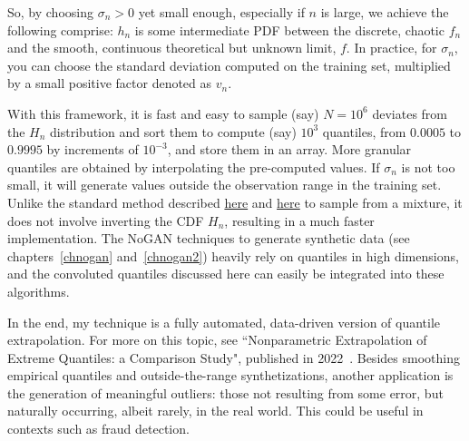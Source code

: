 \documentclass[oneside,10pt]{book}
\begin{document}
So, by choosing $\sigma_n > 0$ yet small enough, especially if $n$ is large, we achieve the
 following comprise: $h_n$ is some intermediate PDF between the discrete, chaotic $f_n$ and the smooth, continuous theoretical but unknown limit, $f$. In practice, for $\sigma_n$, you can choose the standard deviation computed on the training set, multiplied by a small positive factor denoted as $v_n$.


With this framework, it is fast and easy to sample (say) $N=10^6$ deviates from the $H_n$ distribution and sort them to compute (say) $10^3$ quantiles, from $0.0005$ to $0.9995$ by increments of $10^{-3}$, and store them in an array.
More granular quantiles are obtained by interpolating the pre-computed values.
If $\sigma_n$ is not too small, it will generate values outside the observation range in the training set.
 Unlike the standard method described
\href{http://www.awebb.info/probability/2017/05/12/quantiles-of-mixture-distributions.html}{here} and
\href{https://www.jamesatkins.net/posts/quantile-function-of-mixture-distributions-in-python/}{here}
to sample from a mixture, it does not involve inverting the CDF $H_n$, resulting
 in a much faster implementation.  The NoGAN
techniques to generate \textcolor{index}{synthetic data} (see  chapters~\ref{chnogan} and~\ref{chnogan2}) heavily rely on quantiles in high dimensions, and the convoluted quantiles discussed here can easily be
 integrated into these algorithms.

In the end, my technique is a fully automated, data-driven version of
 \textcolor{index}{quantile extrapolation}. For more on this topic,
 see ``Nonparametric Extrapolation of Extreme Quantiles: a Comparison Study",
 published in 2022~\cite{pcper43w}. Besides smoothing empirical quantiles and outside-the-range
 synthetizations, another application is the generation of meaningful outliers: those not
 resulting from some error, but naturally occurring, albeit rarely, in the real world. This could
 be useful in contexts such as fraud detection.
\end{document}
